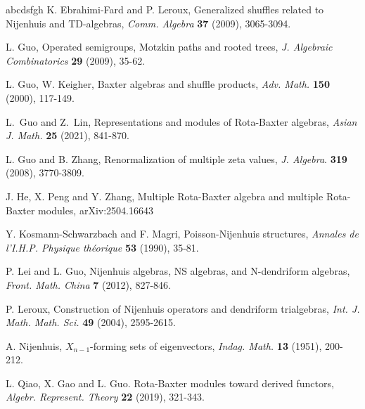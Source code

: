 \documentclass[12pt]{amsart}
\theoremstyle{definition}
\begin{document}
\begin{thebibliography}{abcdsfgh}
 K. Ebrahimi-Fard and P. Leroux, Generalized shuffles related to Nijenhuis and TD-algebras, {\em Comm. Algebra} {\bf 37} (2009), 3065-3094.

 L. Guo, Operated semigroups, Motzkin paths and rooted trees, {\em J. Algebraic Combinatorics} {\bf 29} (2009), 35-62.



 L. Guo, W. Keigher, {Baxter algebras and shuffle products}, {\em Adv. Math.} {\bf 150} (2000), 117-149.

 L.~Guo and Z.~Lin, Representations and modules of Rota-Baxter algebras, {\em Asian J. Math.} {\bf 25} (2021), 841-870.

 L. Guo and B. Zhang, {Renormalization of multiple zeta values}, {\em J. Algebra}. {\bf 319} (2008),
3770-3809.

 J. He, X. Peng and Y. Zhang, Multiple Rota-Baxter algebra and multiple Rota-Baxter modules, arXiv:2504.16643 

 Y. Kosmann-Schwarzbach and F. Magri, Poisson-Nijenhuis structures, {\em Annales de l’I.H.P. Physique th\'eorique} {\bf 53} (1990), 35-81.

 P. Lei and L. Guo, Nijenhuis algebras, NS algebras, and N-dendriform algebras, {\em Front. Math. China} {\bf 7} (2012), 827-846.

 P. Leroux, Construction of Nijenhuis operators and dendriform trialgebras, {\em Int. J. Math. Math. Sci.} {\bf 49} (2004), 2595-2615.


 A. Nijenhuis, $X_{n-1}$-forming sets of eigenvectors, {\em Indag. Math.} {\bf 13} (1951), 200-212.

 L. Qiao, X. Gao and L. Guo. Rota-Baxter modules toward derived functors, {\em Algebr. Represent. Theory} {\bf 22} (2019), 321-343.



\end{thebibliography}
\end{document}
